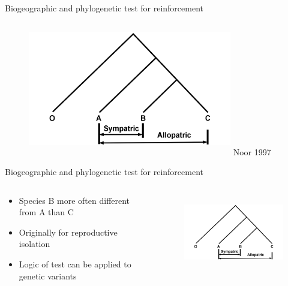 \documentclass[t,10pt]{beamer}
\begin{document}
\begin{frame}[label={sec:orgheadline24}]{Biogeographic and phylogenetic test for reinforcement}
\begin{figure}[htb]
\centering
\includegraphics[width=3.5in,height=2.3in]{./Figures/Biogeography_of_Speciation_phylogeny.png}
Noor 1997
\end{figure}
\end{frame}

\begin{frame}[label={sec:orgheadline25}]{Biogeographic and phylogenetic test for reinforcement}
\begin{columns}
\begin{column}{0.5\columnwidth}
\begin{itemize}[<+->]
\item Species B more often different from A than C
\item Originally for reproductive isolation
\item Logic of test can be applied to genetic variants
\end{itemize}
\end{column}
\begin{column}{0.5\columnwidth}
\begin{figure}[htb]
\centering
\includegraphics[width=2.5in,height=1.3in]{./Figures/Biogeography_of_Speciation_phylogeny.png}
\end{figure}
\end{column}
\end{columns}
\end{frame}
\end{document}
